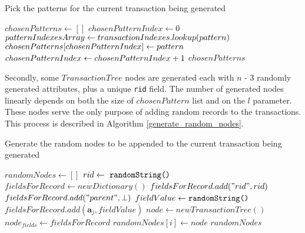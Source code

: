 \documentclass{acm_proc_article-sp-sigmod09}
\begin{document}
\begin{algorithm}
\caption{Pick the patterns for the current transaction being generated}
\label{pick_patterns}
\begin{algorithmic}[1]
\State $chosenPatterns \gets []$
\State $chosenPatternIndex \gets 0$
        \State $patternIndexesArray \gets transaction\-Indexes.lookup(pattern)$
            \State $chosenPatterns[chosen\-Pattern\-Index] \gets pattern$
            \State $chosenPatternIndex \gets chosen\-Pattern\-Index + 1$
        \EndIf
    \EndFor
\EndFor
\Return $chosenPatterns$
\EndFunction
\end{algorithmic}
\end{algorithm}

Secondly, some $TransactionTree$ nodes are generated each with $n$ - 3 randomly generated attributes, plus a unique \texttt{rid} field. The number of generated nodes linearly depends on both the size of $chosenPattern$ list and on the $l$ parameter. These nodes serve the only purpose of adding random records to the transactions. This process is described in Algorithm \ref{generate_random_nodes}.

\begin{algorithm}
\caption{Generate the random nodes to be appended to the current transaction being generated}
\label{generate_random_nodes}
\begin{algorithmic}[1]
\State $randomNodes \gets []$
    \State $rid \gets \text{ \texttt{randomString() }}$
    \State $fieldsForRecord \gets new Dictionary()$
    \State $fieldsForRecord.add("rid", rid)$
    \State $fieldsForRecord.add("parent", \bot)$
        \State $fieldValue \gets \text{\texttt{randomString()}}$
        \State $fieldsForRecord.add(\boldsymbol{a}_j, fieldValue)$
    \EndFor
    \State $node \gets new TransactionTree()$ 
    \State $node_{fields} \gets fieldsForRecord$
    \State $randomNodes[i] \gets node$
\EndFor
\Return $randomNodes$
\EndFunction
\end{algorithmic}
\end{algorithm}
\end{document}
